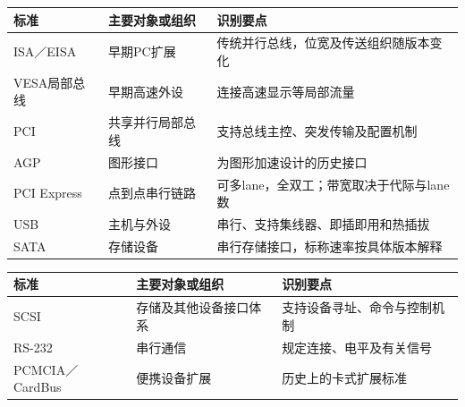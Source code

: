 \par\medskip\noindent\begin{minipage}{\linewidth}\fontsize{9.3}{12}\selectfont\begin{tabularx}{\linewidth}{@{}YYY@{}}
\toprule\noalign{}
\begin{minipage}[b]{\linewidth}\raggedright
标准
\end{minipage} & \begin{minipage}[b]{\linewidth}\raggedright
主要对象或组织
\end{minipage} & \begin{minipage}[b]{\linewidth}\raggedright
识别要点
\end{minipage} \\
\midrule\noalign{}


ISA／EISA & 早期PC扩展 & 传统并行总线，位宽及传送组织随版本变化 \\
VESA局部总线 & 早期高速外设 & 连接高速显示等局部流量 \\
PCI & 共享并行局部总线 & 支持总线主控、突发传输及配置机制 \\
AGP & 图形接口 & 为图形加速设计的历史接口 \\
PCI Express & 点到点串行链路 & 可多lane，全双工；带宽取决于代际与lane数 \\
USB & 主机与外设 & 串行、支持集线器、即插即用和热插拔 \\
SATA & 存储设备 & 串行存储接口，标称速率按具体版本解释 \\
\bottomrule\end{tabularx}
\end{minipage}\par\medskip

\par\medskip\noindent\begin{minipage}{\linewidth}\fontsize{9.3}{12}\selectfont\begin{tabularx}{\linewidth}{@{}YYY@{}}
\toprule\noalign{}
\begin{minipage}[b]{\linewidth}\raggedright
标准
\end{minipage} & \begin{minipage}[b]{\linewidth}\raggedright
主要对象或组织
\end{minipage} & \begin{minipage}[b]{\linewidth}\raggedright
识别要点
\end{minipage} \\
\midrule\noalign{}


SCSI & 存储及其他设备接口体系 & 支持设备寻址、命令与控制机制 \\
RS-232 & 串行通信 & 规定连接、电平及有关信号 \\
PCMCIA／CardBus & 便携设备扩展 & 历史上的卡式扩展标准 \\
\bottomrule\end{tabularx}
\end{minipage}\par\medskip

